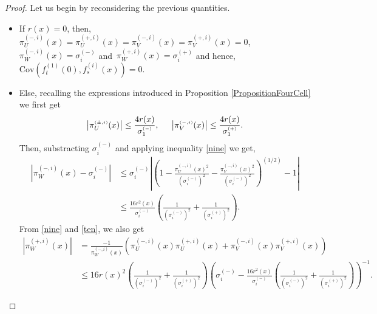 \documentclass[12pt]{article}
\theoremstyle{Theorem}
\theoremstyle{definition}
\begin{document}
\begin{proof}
Let us begin by reconsidering the previous quantities. 
\begin{itemize}
  \item If $r(x) = 0$, then, $\pi^{\scriptscriptstyle(-, i)}_{U}(x) = \pi^{\scriptscriptstyle(+, i)}_{U}(x) = \pi^{\scriptscriptstyle(-, i)}_{V}(x) = \pi^{\scriptscriptstyle(+, i)}_{V}(x) = 0$, $\pi^{\scriptscriptstyle(-, i)}_{W}(x) = \sigma^{(-)}_{i}$ and~$\pi^{\scriptscriptstyle(+, i)}_{W}(x) = \sigma^{(+)}_{i}$ and hence, $\text{Cov}\left(f_{t}^{\scriptscriptstyle(1)}(0), f_{s}^{\scriptscriptstyle(i)}(x) \right) = 0$. 
  \item Else, recalling the expressions introduced in Proposition \ref{PropositionFourCell} we first get 
  \begin{align}
  \label{nine}
   \left|\pi^{\scriptscriptstyle(\pm, i)}_{U}(x)\right| \leq \frac{4r(x)}{\sigma^{\scriptscriptstyle (-)}_{1}}, \hspace{0.5cm} \left|\pi^{\scriptscriptstyle(-, i)}_{V}(x)\right| \leq \frac{4r(x)}{\sigma^{\scriptscriptstyle (+)}_{1}}.
   \end{align}
   Then, substracting $\sigma^{(-)}_{i}$ and applying inequality \eqref{nine} we get, 
   \begin{align}
   \label{ten}
   \left|\pi^{\scriptscriptstyle(-, i)}_{W}(x) - \sigma^{(-)}_{i}\right| & \leq \sigma^{(-)}_{i}\left| \left(1 - \frac{\pi^{\scriptscriptstyle(-, i)}_{U}(x)^{2}}{\left(\sigma^{(-)}_{i}\right)^{2}} - \frac{\pi^{\scriptscriptstyle(-, i)}_{V}(x)^{2}}{\left(\sigma^{(-)}_{i}\right)^{2}}\right)^{\scriptscriptstyle (1/2)} - 1  \right| \nonumber \\
   & \leq \frac{16r^{2}(x)}{\sigma^{(-)}_{i}}\left(\frac{1}{(\sigma^{(-)}_{i})^{2}} + \frac{1}{(\sigma^{(+)}_{i})^{2}} \right).
   \end{align}
   From \eqref{nine} and \eqref{ten}, we also get
   \begin{align}
   \label{eleven}
  \left|\pi^{\scriptscriptstyle(+, i)}_{W}(x)\right| & = \frac{-1}{\pi^{\scriptscriptstyle(-, i)}_{W}(x)}\left(\pi^{\scriptscriptstyle(-, i)}_{U}(x)\pi^{\scriptscriptstyle(+, i)}_{U}(x) + \pi^{\scriptscriptstyle(-, i)}_{V}(x)\pi^{\scriptscriptstyle(+, i)}_{V}(x)\right) \nonumber \\
  &\leq 16r(x)^{2}\left(\frac{1}{(\sigma^{(-)}_{i})^{2}} + \frac{1}{(\sigma^{(+)}_{i})^{2}} \right)\left(\sigma^{(-)}_{i} -  \frac{16r^{2}(x)}{\sigma^{(-)}_{i}}\left(\frac{1}{(\sigma^{(-)}_{i})^{2}} + \frac{1}{(\sigma^{(+)}_{i})^{2}} \right)\right)^{-1}.

\end{align}
\end{itemize}
\end{proof}
\end{document}
